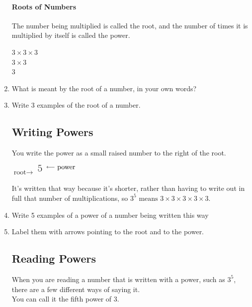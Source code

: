 \documentclass[12pt]{article}
\begin{document}
\begin{enumerate}
\paragraph{Roots of Numbers}
The number being multiplied is called the root, and the number of times it is multiplied by itself is called the power.\\

\begin{center}
$3 \times 3 \times 3$\\
$3 \times 3$\\
$3$
\end{center}

\item What is meant by the root of a number, in your own words?
\item Write 3 examples of the root of a number.

\subsection*{Writing Powers}

You write the power as a small raised number to the right of the root.

\begin{center}
$\text{root}\rightarrow$
{\fontsize{30}{34}}
$\textsuperscript{{\fontsize{15}{20}\selectfont 5} \ \raisebox{1.5ex}{$\longleftarrow$\ }}\raisebox{0.8ex}{\textsuperscript{\normalsize{\text{power}}}}$
\normalsize
\end{center}

It's written that way because it's shorter, rather than having to write out in full that number of multiplications, so $3^5 \text{ means }3 \times 3 \times 3 \times 3 \times 3.$\\

\item Write 5 examples of a power of a number being written this way
\item Label them with arrows pointing to the root and to the power.

\subsection*{Reading Powers}

When you are reading a number that is written with a power, such as $3^5$, there are a few different ways of saying it.\\

You can call it the fifth power of 3.\\


\end{enumerate}
\end{document}
